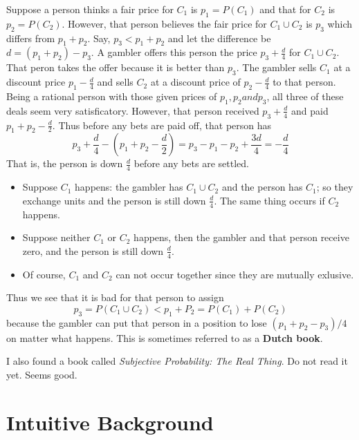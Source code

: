 \documentclass[a4paper]{book}
\newenvironment{proof}[1][Proof]{\begin{trivlist}
\item[\hskip \labelsep {\bfseries #1}]}{\end{trivlist}}
\begin{document}
	\begin{proof}
		Suppose a person thinks a fair price for $C_1$ is $p_1 = P(C_1)$ and
		that for $C_2$ is $p_2 = P(C_2)$. However, that person believes the
		fair price for $C_1 \cup C_2$ is $p_3$ which differs from $p_1 +
		p_2$. Say, $p_3 < p_1 + p_2$ and let the difference be $d = (p_1 +
		p_2) - p_3$. A gambler offers this person the price $p_3 +
		\frac{d}{4}$ for $C_1 \cup C_2$. That peron takes the offer because
		it is better than $p_3$. The gambler sells $C_1$ at a discount price
		$p_1 - \frac{d}{4}$ and sells $C_2$ at a discount price of $p_2 -
		\frac{d}{4}$ to that person. Being a rational person with those
		given prices of $p_1, p_2 and p_3$, all three of these deals seem
		very satisficatory. However, that person received $p_3 +
		\frac{d}{4}$ and paid $p_1 + p_2 - \frac{d}{2}$. Thus before any
		bets are paid off, that person has
		\begin{displaymath}
			p_3 + \frac{d}{4} - (p_1 + p_2 - \frac{d}{2}) = p_3 - p_1 - p_2 +
			\frac{3d}{4} = - \frac{d}{4}
		\end{displaymath}
		That is, the person is down $\frac{d}{4}$ before any bets are settled.
		\begin{itemize}
			\item Suppose $C_1$ happens: the gambler has $C_1 \cup C_2$ and
				the person has $C_1$; so they exchange units and the person is
				still down $\frac{d}{4}$. The same thing occurs if $C_2$
				happens.
			\item
				Suppose neither $C_1$ or $C_2$ happens, then the gambler and
				that person receive zero, and the person is still down
				$\frac{d}{4}$.
			\item
				Of course, $C_1$ and $C_2$ can not occur together since they are
				mutually exlusive.
		\end{itemize}

		Thus we see that it is bad for that person to assign
		\begin{displaymath}
			p_3 = P(C_1 \cup C_2) < p_1 + P_2 = P(C_1) + P(C_2)
		\end{displaymath}
		because the gambler can put that person in a position to lose $(p_1
		+ p_2 - p_3)/4$ on matter what happens. This is sometimes referred
		to as a \textbf{Dutch book}.
	\end{proof}

	I also found a book called \textit{Subjective Probability: The Real
	Thing}. Do not read it yet. Seems good.

\section{Intuitive Background}
\end{document}
